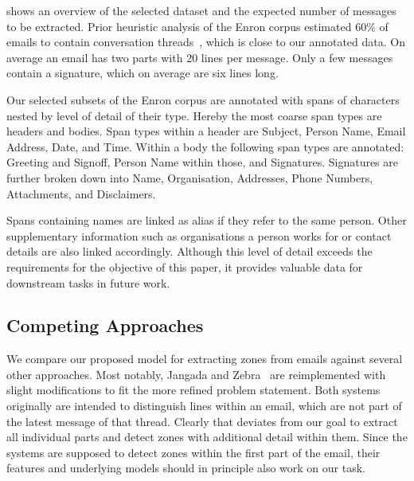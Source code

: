 \documentclass{llncs}
\begin{document}
 shows an overview of the selected dataset and the expected number of messages to be extracted.
Prior heuristic analysis of the Enron corpus estimated 60\% of emails to contain conversation threads~\cite{enron}, which is close to our annotated data.
On average an email has two parts with 20 lines per message.
Only a few messages contain a signature, which on average are six lines long.

Our selected subsets of the Enron corpus are annotated with spans of characters nested by level of detail of their type.
Hereby the most coarse span types are headers and bodies.
Span types within a header are Subject, Person Name, Email Address, Date, and Time.
Within a body the following span types are annotated: Greeting and Signoff, Person Name within those, and Signatures. Signatures are further broken down into Name, Organisation, Addresses, Phone Numbers, Attachments, and Disclaimers.

Spans containing names are linked as alias if they refer to the same person.
Other supplementary information such as organisations a person works for or contact details are also linked accordingly.
Although this level of detail exceeds the requirements for the objective of this paper, it provides valuable data for downstream tasks in future work.





\subsection{Competing Approaches}
We compare our proposed model for extracting zones from emails against several other approaches.
Most notably, Jangada and Zebra~\cite{zones,signature} are reimplemented with slight modifications to fit the more refined problem statement.
Both systems originally are intended to distinguish lines within an email, which are not part of the latest message of that thread.
Clearly that deviates from our goal to extract all individual parts and detect zones with additional detail within them.
Since the systems are supposed to detect zones within the first part of the email, their features and underlying models should in principle also work on our task.
\end{document}
